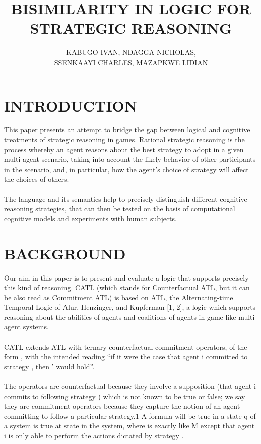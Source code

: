 \documentclass[10pt,a4paper]{article}
\begin{document}
\author{KABUGO IVAN, NDAGGA NICHOLAS,\\ SSENKAAYI CHARLES, MAZAPKWE LIDIAN}
\title{\textbf{BISIMILARITY IN LOGIC FOR STRATEGIC REASONING}}
\maketitle
\section{INTRODUCTION}
This paper presents an attempt to bridge the gap between logical and cognitive treatments of strategic reasoning in games.
Rational strategic reasoning is the process whereby an agent reasons about the best strategy to adopt in a given multi-agent scenario, taking into account the likely behavior of other participants in the scenario, and, in particular, how the agent’s choice of strategy will affect the choices of others.\\\\The language and its semantics help to precisely distinguish different cognitive reasoning strategies, that can then be tested on the basis of computational cognitive models and experiments with human subjects.

\section{BACKGROUND}	
Our aim in this paper is to present and evaluate a logic that supports precisely this kind of reasoning. CATL (which stands for Counterfactual ATL, but it can be also read as Commitment ATL) is based on ATL, the Alternating-time Temporal Logic of Alur, Henzinger, and Kupferman [1, 2], a logic which supports reasoning about the abilities of agents and coalitions of agents in game-like multi-agent systems.\\\\ CATL extends ATL with ternary counterfactual commitment operators, of the form , with the intended reading “if it were the case that agent i committed to strategy , then ' would hold”. \\\\The operators are counterfactual because they involve a supposition (that agent i commits to following strategy ) which is not known to be true or false; we say they are commitment operators because they capture the notion of an agent committing to follow a particular strategy.1 A formula will be true in a state q of a system  is true at state  in the system, where is exactly like M except that agent i is only able to perform the actions dictated by strategy .
\end{document}
